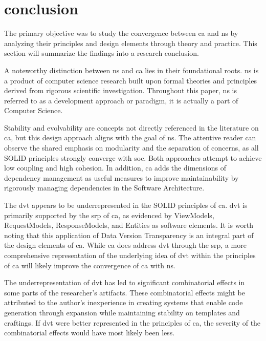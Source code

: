 \section{conclusion}

The primary objective was to study the convergence between \gls{ca} and \gls{ns} by
analyzing their principles and design elements through theory and practice. This section
will summarize the findings into a research conclusion.

A noteworthy distinction between \gls{ns} and \gls{ca} lies in their foundational roots.
\gls{ns} is a product of computer science research built upon formal theories and
principles derived from rigorous scientific investigation. Throughout this
paper, \gls{ns} is referred to as a development approach or paradigm, it is actually a
part of Computer Science.

Stability and evolvability are concepts not directly referenced in the literature on
\gls{ca}, but this design approach aligns with the goal of \gls{ns}. The attentive reader
can observe the shared emphasis on modularity and the separation of concerns, as all SOLID
principles strongly converge with \gls{soc}. Both approaches attempt to achieve low
coupling and high cohesion. In addition, \gls{ca} adds the dimensions of dependency
management as useful measures to improve maintainability by rigorously managing
dependencies in the Software Architecture.

The \gls{dvt} appears to be underrepresented in the SOLID principles of \gls{ca}.
\gls{dvt} is primarily supported by the \gls{srp} of \gls{ca}, as evidenced by ViewModels,
RequestModels, ResponseModels, and Entities as software elements. It is worth noting that
this application of Data Version Transparency  is an integral part of the design elements
of \gls{ca}. While \gls{ca} does address \gls{dvt} through the \gls{srp}, a more
comprehensive representation of the underlying idea of \gls{dvt} within the principles of
\gls{ca} will likely improve the convergence of \gls{ca} with \gls{ns}.

The underrepresentation of \gls{dvt} has led to significant combinatorial effects in some
parts of the researcher's artifacts. These combinatorial effects might be attributed to the
author's inexperience in creating systems that enable code generation through expansion
while maintaining stability on templates and craftings. If \gls{dvt} were better
represented in the principles of \gls{ca}, the severity of the combinatorial effects would
have most likely been less.

